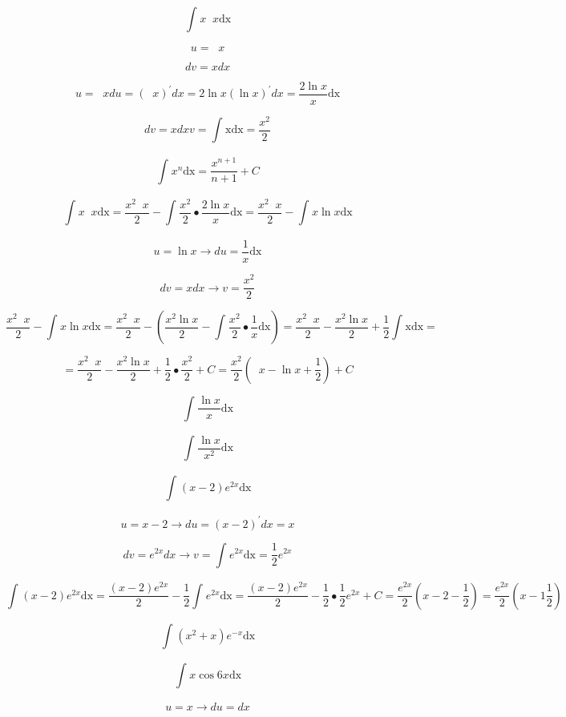 \documentclass[]{article}
\date{}
\begin{document}
\[\int_{}^{}{x\operatorname{}x\text{dx}}\]

\[u = \operatorname{}x\]

\[dv = xdx\]

\[u = \operatorname{}xdu = \left( \operatorname{}x \right)^{'}dx = 2\ln x\left( \ln x \right)^{'}dx = \frac{2\ln x}{x}\text{dx}\]

\[dv = xdxv = \int_{}^{}\text{xdx} = \frac{x^{2}}{2}\]

\[\int_{}^{}{x^{n}\text{dx}} = \frac{x^{n + 1}}{n + 1} + C\]

\[\int_{}^{}{x\operatorname{}x\text{dx}} = \frac{x^{2}\operatorname{}x}{2} - \int_{}^{}{\frac{x^{2}}{2} \bullet \frac{2\ln x}{x}\text{dx}} = \frac{x^{2}\operatorname{}x}{2} - \int_{}^{}{x\ln x\text{dx}}\]

\[u = \ln x \rightarrow du = \frac{1}{x}\text{dx}\]

\[dv = xdx \rightarrow v = \frac{x^{2}}{2}\]

\[\frac{x^{2}\operatorname{}x}{2} - \int_{}^{}{x\ln x\text{dx}} = \frac{x^{2}\operatorname{}x}{2} - \left( \frac{x^{2}\ln x}{2} - \int_{}^{}{\frac{x^{2}}{2} \bullet \frac{1}{x}\text{dx}} \right) = \frac{x^{2}\operatorname{}x}{2} - \frac{x^{2}\ln x}{2} + \frac{1}{2}\int_{}^{}\text{xdx} =\]

\[= \frac{x^{2}\operatorname{}x}{2} - \frac{x^{2}\ln x}{2} + \frac{1}{2} \bullet \frac{x^{2}}{2} + C = \frac{x^{2}}{2}\left( \operatorname{}x - \ln x + \frac{1}{2} \right) + C\]

\[\int_{}^{}{\frac{\ln x}{x}\text{dx}}\]

\[\int_{}^{}{\frac{\ln x}{x^{2}}\text{dx}}\]

\[\int_{}^{}{\left( x - 2 \right)e^{2x}\text{dx}}\]

\[u = x - 2 \rightarrow du = \left( x - 2 \right)^{'}dx = x\]

\[dv = e^{2x}dx \rightarrow v = \int_{}^{}{e^{2x}\text{dx}} = \frac{1}{2}e^{2x}\]

\[\int_{}^{}{\left( x - 2 \right)e^{2x}\text{dx}} = \frac{\left( x - 2 \right)e^{2x}}{2} - \frac{1}{2}\int_{}^{}{e^{2x}\text{dx}} = \frac{\left( x - 2 \right)e^{2x}}{2} - \frac{1}{2} \bullet \frac{1}{2}e^{2x} + C = \frac{e^{2x}}{2}\left( x - 2 - \frac{1}{2} \right) = \frac{e^{2x}}{2}\left( x - 1\frac{1}{2} \right)\]

\[\int_{}^{}{\left( x^{2} + x \right)e^{- x}\text{dx}}\]

\[\int_{}^{}{x\cos{6x}\text{dx}}\]

\[u = x \rightarrow du = dx\]
\end{document}
